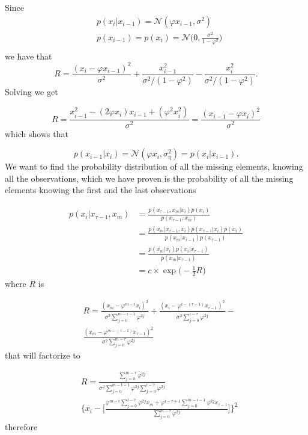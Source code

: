 Since
\begin{align*}
    &p(x_i | x_{i-1}) = \mathcal{N}(\varphi x_{i-1}, \sigma^2)\\
    &p(x_{i-1}) = p(x_i) = \mathcal{N} \Bigg(0, \frac{\sigma^2}{1-\varphi^2} \Bigg)\\
\end{align*}
we have that
\begin{equation*}
    R = \frac{(x_i - \varphi x_{i-1})^2}{\sigma^2} + \frac{x_{i-1}^2}{\sigma^2 / (1-\varphi^2)} - \frac{x_{i}^2}{\sigma^2 / (1-\varphi^2)}.
\end{equation*}
Solving we get

\begin{equation*}
    R = \frac{x_{i-1}^2 - (2\varphi x_i) x_{i-1}+ (\varphi^2 x_i^2)}{\sigma^2} = \frac{(x_{i-1} - \varphi x_i)^2}{\sigma^2}
\end{equation*}
which shows that

\begin{equation*}
    p(x_{i-1} | x_i) = \mathcal{N}(\varphi x_i, \sigma^2_\eta) = p(x_i | x_{i-1}).
\end{equation*}
We want to find the probability distribution of all the missing elements, knowing all the observations, which we have proven is the probability of all the missing elements knowing the first and the last observations

\begin{align*}
    p(x_i | x_{\tau-1}, x_m) &= \frac{p(x_{\tau-1}, x_m | x_i) p(x_i)}{p(x_{\tau-1}, x_m)} \\
    &= \frac{p(x_m | x_{\tau-1}, x_i) p(x_{\tau-1} | x_i) p(x_i)}{p(x_m | x_{\tau-1}) p(x_{\tau-1})} \\
    &= \frac{p(x_m | x_i) p(x_i | x_{\tau-1})}{p(x_m | x_{\tau-1})} \\
    &= c\times \exp\Big(-\frac{1}{2} R\Big)
\end{align*}
where $R$ is

\begin{align*}
    &R = \frac{(x_m - \varphi^{m-i} x_i)^2}{\sigma^2 \sum_{j=0}^{m-i-1} \varphi^{2j}} + \frac{(x_i - \varphi^{i-(\tau-1)} x_{\tau-1})^2}{\sigma^2 \sum_{j=0}^{i-\tau} \varphi^{2j}} - \\
    &\frac{(x_m - \varphi^{m -(\tau-1)} x_{\tau-1})^2}{\sigma^2 \sum_{j=0}^{m-\tau} \varphi^{2j}}
\end{align*}
that will factorize to

\begin{align*}
    &R = \frac{\sum_{j=0}^{m-\tau} \varphi^{2j}}{\sigma^2 \sum_{j=0}^{m-t-1} \varphi^{2j} \sum_{j=0}^{i-\tau} \varphi^{2j}} \\
    &\Bigg\{ x_i - \Bigg[\frac{\varphi^{m-i} \sum_{j=0}^{i-\tau} \varphi^{2j} x_{m} + \varphi^{i-\tau+1} \sum_{j=0}^{m-i-1} \varphi^{2j} x_{\tau-1}}{\sum_{j=0}^{m-\tau} \varphi^{2j}}\Bigg] \Bigg\}^2
\end{align*}
therefore


